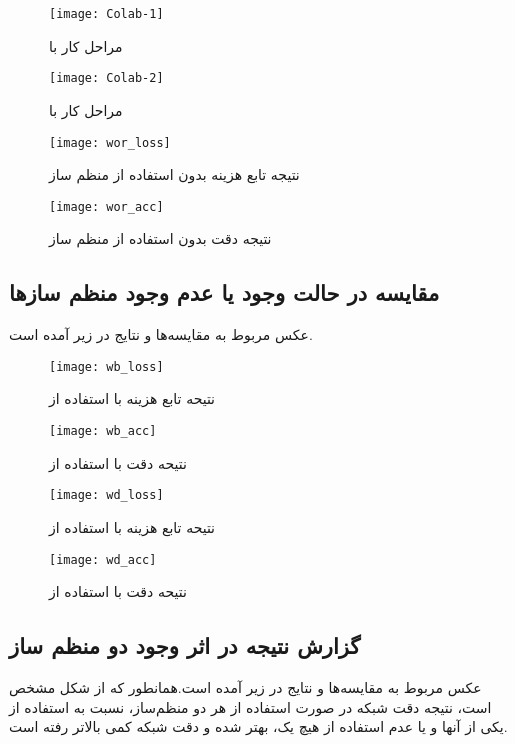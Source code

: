 \documentclass{article}
\begin{document}
\begin{figure}[H]
	\centerline{\texttt{[image: Colab-1]}}
	\caption{مراحل کار با }
\end{figure}

\begin{figure}[H]
	\centerline{\texttt{[image: Colab-2]}}
	\caption{مراحل کار با }
\end{figure}

\begin{figure}[H]
	\centerline{\texttt{[image: wor\_loss]}}
	\caption{نتیجه تابع هزینه بدون استفاده از منظم ساز}
\end{figure}

\begin{figure}[H]
	\centerline{\texttt{[image: wor\_acc]}}
	\caption{نتیجه دقت بدون استفاده از منظم ساز}
\end{figure}

\subsection{مقایسه در حالت وجود یا عدم وجود منظم ساز‌ها}
عکس مربوط به مقایسه‌ها و نتایج در زیر آمده است.
\begin{figure}[H]
	\centerline{\texttt{[image: wb\_loss]}}
	\caption{نتیحه تابع هزینه با استفاده از }
\end{figure}

\begin{figure}[H]
	\centerline{\texttt{[image: wb\_acc]}}
	\caption{نتیحه دقت با استفاده از }
\end{figure}

\begin{figure}[H]
	\centerline{\texttt{[image: wd\_loss]}}
	\caption{نتیحه تابع هزینه با استفاده از }
\end{figure}

\begin{figure}[H]
	\centerline{\texttt{[image: wd\_acc]}}
	\caption{نتیحه دقت با استفاده از }
\end{figure}

\subsection{گزارش نتیجه در اثر وجود دو منظم ساز}
عکس مربوط به مقایسه‌ها و نتایج در زیر آمده است.همانطور که از شکل مشخص است، نتیجه دقت شبکه در صورت استفاده از هر دو منظم‌ساز، نسبت به استفاده از یکی از آنها و یا عدم استفاده از هیچ یک، بهتر شده و دقت شبکه کمی بالاتر رفته است.
\end{document}
